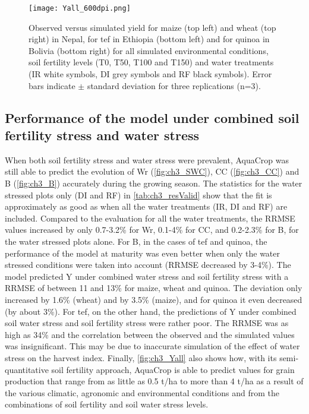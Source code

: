 \begin{figure}[tbhp]
	\centering
		\texttt{[image: Yall\_600dpi.png]}
	\caption{Observed versus simulated yield for maize (top left) and wheat (top right) in Nepal, for tef in Ethiopia (bottom left) and for quinoa in Bolivia (bottom right) for all simulated environmental conditions, soil fertility levels (T0, T50, T100 and T150) and water treatments (IR white symbols, DI grey symbols and RF black symbols). Error bars indicate $\pm$ standard deviation for three replications (n=3).}
	\label{fig:ch3_Yall}
\end{figure}

\subsection{Performance of the model under combined soil fertility stress and water stress}
When both soil fertility stress and water stress were prevalent, AquaCrop was still able to predict the evolution of Wr (\autoref{fig:ch3_SWC}), CC (\autoref{fig:ch3_CC}) and B (\autoref{fig:ch3_B}) accurately during the growing season. The statistics for the water stressed plots only (DI and RF) in \autoref{tab:ch3_resValid} show that the fit is approximately as good as when all the water treatments (IR, DI and RF) are included. Compared to the evaluation for all the water treatments, the RRMSE values increased by only 0.7-3.2\% for Wr, 0.1-4\% for CC, and 0.2-2.3\% for B, for the water stressed plots alone. For B, in the cases of tef and quinoa, the performance of the model at maturity was even better when only the water stressed conditions were taken into account (RRMSE decreased by 3-4\%). The model predicted Y under combined water stress and soil fertility stress with a RRMSE of between 11 and 13\% for maize, wheat and quinoa. The deviation only increased by 1.6\% (wheat) and by 3.5\% (maize), and for quinoa it even decreased (by about 3\%). For tef, on the other hand, the predictions of Y under combined soil water stress and soil fertility stress were rather poor. The RRMSE was as high as 34\% and the correlation between the observed and the simulated values was insignificant. This may be due to inaccurate simulation of the effect of water stress on the harvest index. Finally, \autoref{fig:ch3_Yall} also shows how, with its semi-quantitative soil fertility approach, AquaCrop is able to predict values for grain production that range from as little as 0.5 t/ha to more than 4 t/ha as a result of the various climatic, agronomic and environmental conditions and from the combinations of soil fertility and soil water stress levels.

